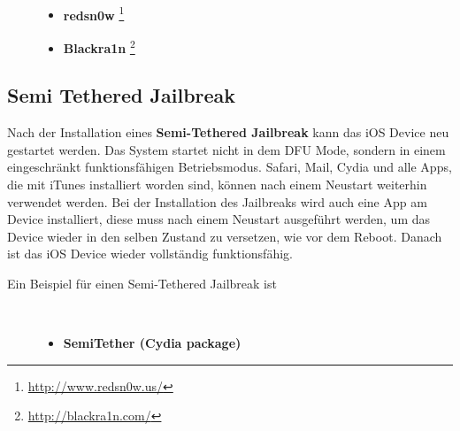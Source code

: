 \begin{description}
     \item[\parbox{\textwidth} {Nachfolgend werden zwei häufig verwendete Tethered-Jailbreak Tools angeführt}]~\par
	\begin{itemize}
            \item \textbf{redsn0w} \footnote{\url{http://www.redsn0w.us/}} 
            \item \textbf{Blackra1n} \footnote{\url{http://blackra1n.com/}}
    \end{itemize}
\end{description} 
\subsection{Semi Tethered Jailbreak}
\label{sec:JBSemiTethered}

Nach der Installation eines \textbf{Semi-Tethered Jailbreak} kann das iOS Device neu gestartet werden. Das System startet nicht in dem DFU Mode, sondern in einem eingeschränkt funktionsfähigen Betriebsmodus. Safari, Mail, Cydia und alle Apps, die mit iTunes installiert worden sind, können nach einem Neustart weiterhin verwendet werden. Bei der Installation des Jailbreaks wird auch eine App am Device installiert, diese muss nach einem Neustart ausgeführt werden, um das Device wieder in den selben Zustand zu versetzen, wie vor dem Reboot. Danach ist das iOS Device wieder vollständig funktionsfähig.

\begin{description}
    \item[Ein Beispiel für einen Semi-Tethered Jailbreak ist]~\par
	\begin{itemize}
        \item \textbf{SemiTether (Cydia package)}
    \end{itemize}
\end{description} 

